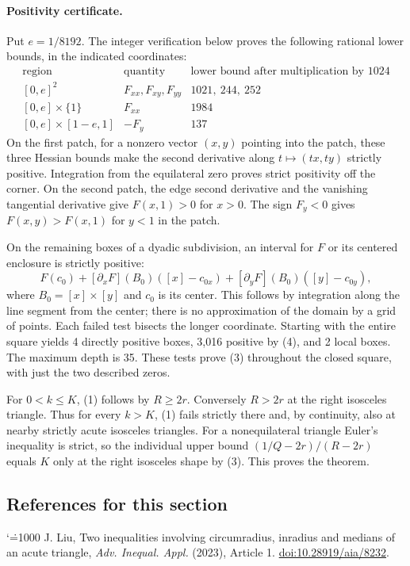 \documentclass[11pt,a4paper]{article}
\makeatletter
\numberwithin{equation}{section}
\theoremstyle{definition}
\theoremstyle{remark}
\renewenvironment{thebibliography}[1]
 {\subsection*{References for this section}\small
  \list{\@biblabel{\@arabic\c@enumiv}}
       {\settowidth\labelwidth{\@biblabel{#1}}\leftmargin\labelwidth
        \advance\leftmargin\labelsep\@openbib@code
        \usecounter{enumiv}\let\p@enumiv\@empty
        \renewcommand\theenumiv{\@arabic\c@enumiv}}
  \sloppy\clubpenalty4000\widowpenalty4000\sfcode`\.=1000\relax}
 {\def\@noitemerr{\@latex@warning{Empty bibliography}}\endlist}
\makeatother
\begin{document}
\paragraph{Positivity certificate.}
Put $e=1/8192$. The integer verification below proves the following rational lower bounds, in the indicated coordinates:
\[
\begin{array}{c|c|r}
\text{region}&\text{quantity}&\text{lower bound after multiplication by }1024\\ \hline
{[0,e]}^2&F_{xx},F_{xy},F_{yy}&1021,\ 244,\ 252\\
{[0,e]}\times\{1\}&F_{xx}&1984\\
{[0,e]}\times[1-e,1]&-F_y&137
\end{array}
\]
On the first patch, for a nonzero vector $(x,y)$ pointing into the patch, these three Hessian bounds make the second derivative along $t\mapsto(tx,ty)$ strictly positive. Integration from the equilateral zero proves strict positivity off the corner. On the second patch, the edge second derivative and the vanishing tangential derivative give $F(x,1)>0$ for $x>0$. The sign $F_y<0$ gives $F(x,y)>F(x,1)$ for $y<1$ in the patch.

On the remaining boxes of a dyadic subdivision, an interval for $F$ or its centered enclosure is strictly positive:
\[
 F(c_0)+[\partial_x F](B_0)([x]-c_{0x})
       +[\partial_y F](B_0)([y]-c_{0y}),\tag{4}
\]
where $B_0=[x]\times[y]$ and $c_0$ is its center. This follows by integration along the line segment from the center; there is no approximation of the domain by a grid of points. Each failed test bisects the longer coordinate. Starting with the entire square yields 4 directly positive boxes, 3,016 positive by (4), and 2 local boxes. The maximum depth is 35. These tests prove (3) throughout the closed square, with just the two described zeros.

For $0<k\le K$, (1) follows by $R\ge 2r$. Conversely $R>2r$ at the right isosceles triangle. Thus for every $k>K$, (1) fails strictly there and, by continuity, also at nearby strictly acute isosceles triangles. For a nonequilateral triangle Euler's inequality is strict, so the individual upper bound $(1/Q-2r)/(R-2r)$ equals $K$ only at the right isosceles shape by (3). This proves the theorem.

\begin{thebibliography}{9}
 J. Liu, Two inequalities involving circumradius, inradius and medians of an acute triangle, \emph{Adv. Inequal. Appl.} (2023), Article 1.
\href{https://doi.org/10.28919/aia/8232}{doi:10.28919/aia/8232}.
\end{thebibliography}
\end{document}
